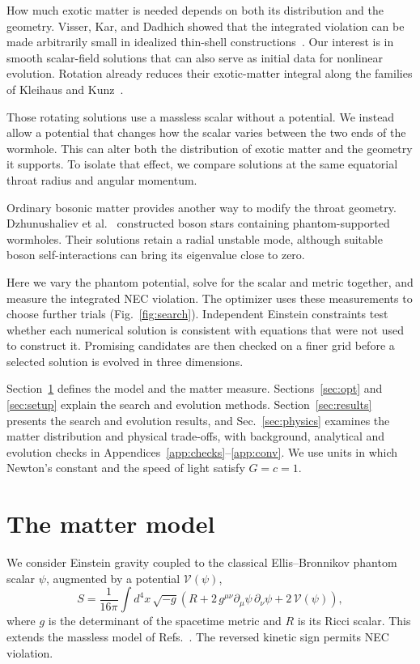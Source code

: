 \documentclass[twocolumn,floatfix,aps,prd,superscriptaddress,nofootinbib]{revtex4-2}
\begin{document}
How much exotic matter is needed depends on both its distribution and the geometry. Visser, Kar, and Dadhich showed that the integrated violation can be made arbitrarily small in idealized thin-shell constructions~\cite{visser2003,fewster2005}. Our interest is in smooth scalar-field solutions that can also serve as initial data for nonlinear evolution. Rotation already reduces their exotic-matter integral along the families of Kleihaus and Kunz~\cite{kleihaus_kunz2014,chew2016,shirokov2026s}.

Those rotating solutions use a massless scalar without a potential. We instead allow a potential that changes how the scalar varies between the two ends of the wormhole. This can alter both the distribution of exotic matter and the geometry it supports. To isolate that effect, we compare solutions at the same equatorial throat radius and angular momentum.

Ordinary bosonic matter provides another way to modify the throat geometry. Dzhunushaliev et al.~\cite{dzhunushaliev2014topology} constructed boson stars containing phantom-supported wormholes. Their solutions retain a radial unstable mode, although suitable boson self-interactions can bring its eigenvalue close to zero.

Here we vary the phantom potential, solve for the scalar and metric together, and measure the integrated NEC violation. The optimizer uses these measurements to choose further trials (Fig.~\ref{fig:search}). Independent Einstein constraints test whether each numerical solution is consistent with equations that were not used to construct it. Promising candidates are then checked on a finer grid before a selected solution is evolved in three dimensions.

Section~\ref{sec:model} defines the model and the matter measure. Sections~\ref{sec:opt} and \ref{sec:setup} explain the search and evolution methods. Section~\ref{sec:results} presents the search and evolution results, and Sec.~\ref{sec:physics} examines the matter distribution and physical trade-offs, with background, analytical and evolution checks in
Appendices~\ref{app:checks}--\ref{app:conv}. We use units in which Newton's constant and the speed of light satisfy $G=c=1$.

\section{The matter model}
\label{sec:model}

We consider Einstein gravity coupled to the classical Ellis--Bronnikov phantom scalar $\psi$, augmented by a potential $\mathcal{V}(\psi)$,
\begin{equation}
S=\frac{1}{16\pi}\int d^4x\,\sqrt{-g}\left(R+2\,g^{\mu\nu}\partial_\mu\psi\,\partial_\nu\psi+2\,\mathcal{V}(\psi)\right),
\label{eq:action}
\end{equation}
where $g$ is the determinant of the spacetime metric and $R$ is its Ricci scalar. This extends the massless model of Refs.~\cite{kleihaus_kunz2014,chew2016,shirokov2026s}. The reversed kinetic sign permits NEC violation.
\end{document}
